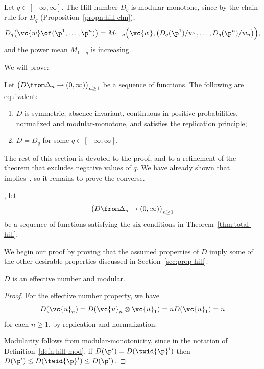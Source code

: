 \begin{example}
Let $q \in [-\infty, \infty]$.  The Hill number $D_q$ is modular-monotone,
since by the chain rule for $D_q$ (Proposition~\ref{propn:hill-chn}), 
\[
D_q\bigl(\vc{w} \of (\p^1, \ldots, \p^n)\bigr)
=
M_{1 - q}\Bigl( \vc{w},
\bigl( D_q(\p^1)/w_1, \ldots, D_q(\p^n)/w_n \bigr) 
\Bigr),
\]
and the power mean $M_{1 - q}$ is increasing.
\end{example}

We will prove:

\begin{thm}
% 
Let $\bigl( D \from \Delta_n \to (0, \infty) \bigr)_{n \geq 1}$ be a
sequence of functions.  The following are equivalent:
% 
\begin{enumerate}
\item 
{}
$D$ is symmetric, absence-invariant, continuous in positive probabilities,
normalized and modular-monotone, and satisfies the replication principle;

\item
{}
$D = D_q$ for some $q \in [-\infty, \infty]$.
\end{enumerate}
\end{thm}

The rest of this section is devoted to the proof, and to a refinement of
the theorem that excludes negative values of $q$.  We have already shown
that~ implies~, so
it remains to prove the converse.

, let
\[
\bigl( D \from \Delta_n \to (0, \infty) \bigr)_{n \geq 1}
\]
be a sequence of functions satisfying the six conditions in
Theorem~\ref{thm:total-hill}.

We begin our proof by proving that the assumed properties of $D$ imply some
of the other desirable properties discussed in Section~\ref{sec:prop-hill}.

\begin{lemma}
$D$ is an effective number and modular.
\end{lemma}

\begin{proof}
For the effective number property, we have
\[
D(\vc{u}_n) = D(\vc{u}_n \otimes \vc{u}_1) = nD(\vc{u}_1) = n
\]
for each $n \geq 1$, by replication and normalization.

Modularity follows from modular-monotonicity, since in the notation of
Definition~\ref{defn:hill-mod}, if $D(\p^i) = D(\twid{\p}^i)$ then $D(\p^i)
\leq D(\twid{\p}^i) \leq D(\p^i)$.
\end{proof}

